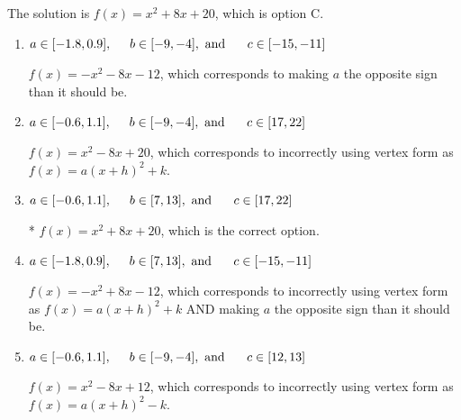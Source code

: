 \documentclass{extbook}[14pt]
\begin{document}
\begin{enumerate}
{The solution is \( f(x) = x^{2} +8 x + 20 \), which is option C.\begin{enumerate}[label=\Alph*.]
\item \( a \in [-1.8, 0.9], \hspace*{5mm} b \in [-9, -4], \text{ and } \hspace*{5mm} c \in [-15, -11] \)

$f(x)=-x^{2} -8 x -12$, which corresponds to making $a$ the opposite sign than it should be.
\item \( a \in [-0.6, 1.1], \hspace*{5mm} b \in [-9, -4], \text{ and } \hspace*{5mm} c \in [17, 22] \)

$f(x)=x^{2} -8 x + 20$, which corresponds to incorrectly using vertex form as $f(x) = a(x+h)^2+k$.
\item \( a \in [-0.6, 1.1], \hspace*{5mm} b \in [7, 13], \text{ and } \hspace*{5mm} c \in [17, 22] \)

* $f(x)=x^{2} +8 x + 20$, which is the correct option.
\item \( a \in [-1.8, 0.9], \hspace*{5mm} b \in [7, 13], \text{ and } \hspace*{5mm} c \in [-15, -11] \)

$f(x)=-x^{2} +8 x -12$, which corresponds to incorrectly using vertex form as $f(x) = a(x+h)^2+k$ AND making $a$ the opposite sign than it should be.
\item \( a \in [-0.6, 1.1], \hspace*{5mm} b \in [-9, -4], \text{ and } \hspace*{5mm} c \in [12, 13] \)

$f(x)=x^{2} -8 x + 12$, which corresponds to incorrectly using vertex form as $f(x) = a(x+h)^2 - k$.
\end{enumerate}

}
\end{enumerate}
\end{document}
